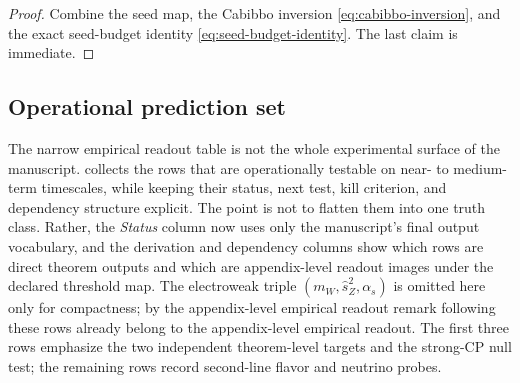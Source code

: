 \documentclass[11pt,a4paper]{article}
\theoremstyle{definition}
\theoremstyle{remark}
\begin{document}
\begin{proof}
Combine the seed map, the Cabibbo inversion \eqref{eq:cabibbo-inversion}, and the exact
seed-budget identity \eqref{eq:seed-budget-identity}. The last claim is immediate.
\end{proof}

\subsection{Operational prediction set}

The narrow empirical readout table is not the whole experimental surface of the manuscript.
 collects the rows that are operationally testable on near-
to medium-term timescales, while keeping their status, next test, kill criterion, and dependency
structure explicit. The point is not to flatten them into one truth class. Rather, the
\emph{Status} column now uses only the manuscript's final output vocabulary, and the derivation
and dependency columns show which rows are direct theorem outputs and which are appendix-level
readout images under the declared threshold map. The electroweak triple
$(m_W,\hat s_Z^2,\alpha_s)$ is omitted here only for compactness; by
the appendix-level empirical readout remark following  these rows
already belong to the appendix-level empirical readout. The first three rows emphasize the two
independent theorem-level targets and the strong-CP null test; the remaining rows record
second-line flavor and neutrino probes.
\end{document}
